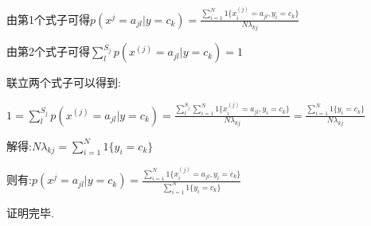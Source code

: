 \documentclass[UTF8]{ctexart}
\begin{document}
  由第1个式子可得$ p( x^j = a_{jl} | y=c_k ) = \frac{ \sum\limits^N_{i=1} 1 \{ x^{(j)}_i=a_{jl},y_i=c_k \} }{ N \lambda_{kj} }$

  由第2个式子可得$ \sum\limits^{S_j}_l p(x^{(j)} =a_{jl} | y=c_k ) = 1 $

  联立两个式子可以得到:

  $1= \sum\limits^{S_j}_l p(x^{(j)} =a_{jl} | y=c_k ) =  \frac{  \sum\limits^{S_j}_l \sum\limits^N_{i=1} 1 \{ x^{(j)}_i=a_{jl},y_i=c_k \} }{ N \lambda_{kj} } = \frac{ \sum\limits^N_{i=1} 1 \{ y_i=c_k \} }{ N \lambda_{kj} }$

  解得:$ N \lambda_{kj} = \sum\limits^N_{i=1} 1 \{ y_i=c_k \} $

  则有:$ p( x^j = a_{jl} | y=c_k ) = \frac{  \sum\limits^N_{i=1} 1 \{ x^{(j)}_i=a_{jl},y_i=c_k \} }{ \sum\limits^N_{i=1} 1 \{ y_i=c_k \} }$

  证明完毕.
\end{document}
